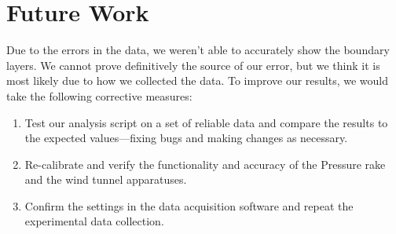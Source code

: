\section{Future Work} \label{sec:FutureWork}

Due to the errors in the data, we weren't able to accurately show the boundary layers. We cannot prove definitively the source
of our error, but we think it is most likely due to how we collected the data. To improve our results, we would take the following corrective measures:

\begin{enumerate}
    \item Test our analysis script on a set of reliable data and compare the results to the expected values—fixing bugs and making changes as necessary.
    \item Re-calibrate and verify the functionality and accuracy of the Pressure rake and the wind tunnel apparatuses.
    \item Confirm the settings in the data acquisition software and repeat the experimental data collection.
\end{enumerate}